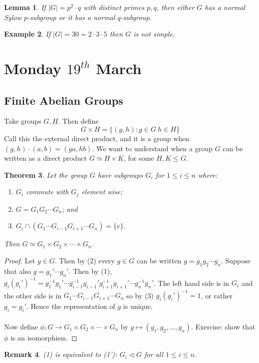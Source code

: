 \documentclass[a4paper,10pt]{article}
\newtheorem{thm}{Theorem}
\newtheorem{eg}[thm]{Example}
\newtheorem{Lem}[thm]{Lemma}
\newtheorem{rem}[thm]{Remark}
\begin{document}
\begin{Lem}
If $|G| = p^2 \cdot q$ with distinct primes $p,q$, then either $G$ has a normal Sylow $p$-subgroup or it has a normal $q$-subgroup.
\end{Lem}

\begin{eg}
If $|G| = 30 = 2 \cdot 3 \cdot 5$ then $G$ is not simple.
\end{eg}












\newpage
\section{Monday $19^{th}$ March}

\subsection{Finite Abelian Groups}

Take groups $G,H$. Then define
\[ G \times H = \{ (g ,h) : g \in G \ h \in H \} \]
Call this the external direct product, and it is a group when  $(g,h) \cdot (a,b) = (ga, hb)$. We want to understand when a group $G$ can be written as a direct product $G \simeq H \times K$, for some $H, K \leq G$.  

\begin{thm}
Let the group $G$ have subgroups $G_i$ for $1 \leq i \leq n$ where:
\begin{enumerate}
\item $G_i$ commute with $G_j$ element wise;
\item $G = G_1 G_2 \cdots G_n$; and
\item $G_i \cap (G_1 \cdots G_{i-1}G_{i+1} \cdots G_n) = \{e\}$.
\end{enumerate}
Then $G \simeq G_1 \times G_2 \times \cdots \times G_n$. 
\end{thm}

\begin{proof}
Let $g \in G$. Then by (2) every $g \in G$ can be written $g = g_1 g_2 \cdots g_n$. Suppose that also $g = g_1 ' \cdots g_n '$. Then by (1), $g_i  (g_i')^{-1} = g_1^{-1} g_1' \cdots g_{i-1}^{-1} g_{i-1}' g_{i+1}^{-1} g_{i+1}' \cdots g_n^{-1} g_n'$. The left hand side is in $G_i$ and the other side is in $G_1 \cdots G_{i-1}G_{i+1} \cdots G_n$ so by (3) $g_i (g_i')^{-1} = 1$, or rather $g_i = g_i '$. Hence the representation of $g$ is unique. \\
\\
Now define $\phi ; G \rightarrow G_1 \times G_2 \times \cdots \times G_n$ by $g \mapsto (g_1, g_2, \dots, g_n)$. Exercise: show that $\phi$ is an isomorphism. 
\end{proof}
\begin{rem}
(1) is equivalent to (1'): $G_i \triangleleft G$ for all $1 \leq i \leq n$. 
\end{rem}
\end{document}
